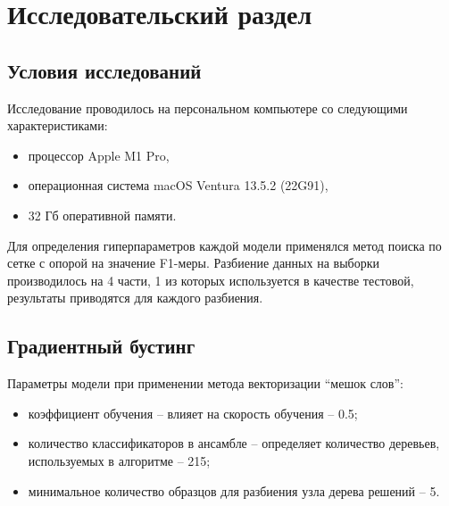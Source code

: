 \section{Исследовательский раздел}
\subsection{Условия исследований}
Исследование проводилось на персональном компьютере со следующими характеристиками:

\begin{itemize}
\item процессор Apple M1 Pro,
\item операционная система macOS Ventura 13.5.2 (22G91),
\item 32 Гб оперативной памяти.
\end{itemize}

Для определения гиперпараметров каждой модели применялся метод поиска по сетке с опорой на значение F1-меры. Разбиение данных на выборки производилось на 4 части, 1 из которых используется в качестве тестовой, результаты приводятся для каждого разбиения.

\subsection{Градиентный бустинг }

Параметры модели при применении метода векторизации ``мешок слов'':
\begin{itemize}
	\item коэффициент обучения -- влияет на скорость обучения -- 0.5;
	\item количество классификаторов в ансамбле -- определяет количество деревьев, используемых в алгоритме -- 215;
	\item минимальное количество образцов для разбиения узла дерева решений -- 5.
\end{itemize}


